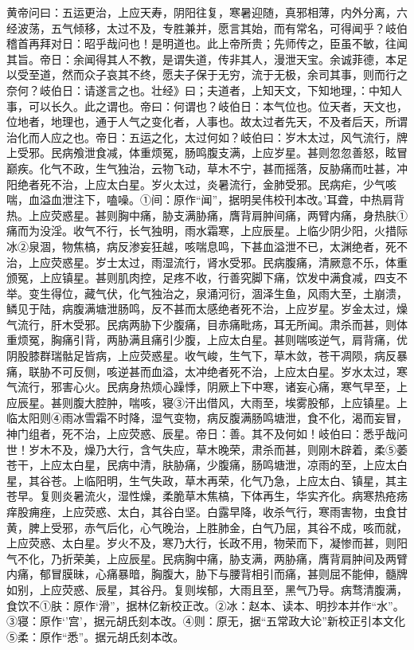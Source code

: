 \documentclass[a4paper,12pt,UTF8,twoside]{ctexbook}
\begin{document}
黄帝问曰：五运更治，上应天寿，阴阳往复，寒暑迎随，真邪相薄，内外分离，六经波荡，五气倾移，太过不及，专胜兼并，愿言其始，而有常名，可得闻乎？岐伯稽首再拜对日：昭乎哉问也！是明道也。此上帝所贵；先师传之，臣虽不敏，往闻其旨。帝日：余闻得其人不教，是谓失道，传非其人，漫泄天宝。余诚菲德，本足以受至道，然而众子哀其不终，愿夫子保于无穷，流于无极，余司其事，则而行之奈何？岐伯日：请遂言之也。壮经》曰；夫道者，上知天文，下知地理，：中知人事，可以长久。此之谓也。帝曰：何谓也？岐伯日：本气位也。位天者，天文也，位地者，地理也，通于人气之变化者，人事也。故太过者先天，不及者后天，所谓治化而人应之也。帝日：五运之化，太过何如？岐伯曰：岁木太过，风气流行，牌上受邪。民病飧泄食减，体重烦冤，肠鸣腹支满，上应岁星。甚则忽忽善怒，眩冒巅疾。化气不政，生气独治，云物飞动，草木不宁，甚而摇落，反胁痛而吐甚，冲阳绝者死不治，上应太白星。岁火太过，炎暑流行，金肺受邪。民病疟，少气咳喘，血溢血泄注下，嗑噪。①间：原作“闻”，据明吴伟校刊本改。’耳聋，中热肩背热。上应荧惑星。甚则胸中痛，胁支满胁痛，膺背肩肿间痛，两臂内痛，身热肤①痛而为没淫。收气不行，长气独明，雨水霜寒，上应辰星。上临少阴少阳，火措际冰②泉涸，物焦槁，病反渗妄狂越，咳喘息鸣，下甚血溢泄不已，太渊绝者，死不治，上应荧惑星。岁士太过，雨湿流行，肾水受邪。民病腹痛，清厥意不乐，体重颁冤，上应镇星。甚则肌肉控，足疼不收，行善究脚下痛，饮发中满食减，四支不举。变生得位，藏气伏，化气独治之，泉涌河衍，涸泽生鱼，风雨大至，土崩溃，鳞见于陆，病腹满塘泄肠鸣，反不甚而太感绝者死不治，上应岁星。岁金太过，燥气流行，肝木受邪。民病两胁下少腹痛，目赤痛毗疡，耳无所闻。肃杀而甚，则体重烦冤，胸痛引背，两胁满且痛引少腹，上应太白星。甚则喘咳逆气，肩背痛，优阴股膝群瑞骷足皆病，上应荧惑星。收气峻，生气下，草木敛，苍干凋陨，病反暴痛，联胁不可反侧，咳逆甚而血溢，太冲绝者死不治，上应太白星。岁水太过，寒气流行，邪害心火。民病身热烦心躁悸，阴厥上下中寒，诸妄心痛，寒气早至，上应辰星。甚则腹大腔肿，喘咳，寝③汗出借风，大雨至，埃雾股郁，上应镇星。上临太阳则④雨冰雪霜不时降，湿气变物，病反腹满肠鸣塘泄，食不化，渴而妄冒，神门组者，死不治，上应荧惑、辰星。帝日：善。其不及何如！岐伯曰：悉乎哉问世！岁木不及，燥乃大行，含气失应，草木晚荣，肃杀而甚，则刚木辟着，柔⑤萎苍干，上应太白星，民病中清，肤胁痛，少腹痛，肠鸣塘泄，凉雨的至，上应太白星，其谷苍。上临阳明，生气失政，草木再荣，化气乃急，上应太白、镇星，其主苍早。复则炎暑流火，湿性燥，柔脆草木焦槁，下体再生，华实齐化。病寒热疮疡痒股痈痤，上应荧惑、太白，其谷白坚。白露早降，收杀气行，寒雨害物，虫食甘黄，脾上受邪，赤气后化，心气晚治，上胜肺金，白气乃屈，其谷不成，咳而就，上应荧惑、太白星。岁火不及，寒乃大行，长政不用，物荣而下，凝惨而甚，则阳气不化，乃折荣美，上应辰星。民病胸中痛，胁支满，两胁痛，膺背肩肿间及两臂内痛，郁冒膜昧，心痛暴暗，胸腹大，胁下与腰背相引而痛，甚则屈不能伸，髓牌如别，上应荧惑、辰星，其谷丹。复则埃郁，大雨且至，黑气乃导。病骛清腹满，食饮不①肤：原作‘滑”，据林亿新校正改。②冰：赵本、读本、明抄本并作“水”。③寝：原作‘’宫’，据元胡氏刻本改。④则：原无，据“五常政大论”新校正引本文化⑤柔：原作“悉”。据元胡氏刻本改。
\end{document}
